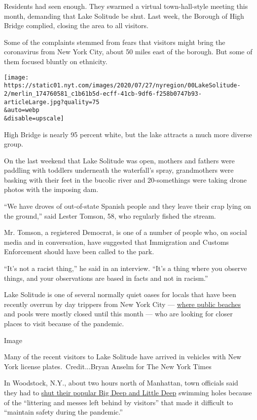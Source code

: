 Residents had seen enough. They swarmed a virtual town-hall-style
meeting this month, demanding that Lake Solitude be shut. Last week, the
Borough of High Bridge complied, closing the area to all visitors.

Some of the complaints stemmed from fears that visitors might bring the
coronavirus from New York City, about 50 miles east of the borough. But
some of them focused bluntly on ethnicity.

\texttt{[image: https://static01.nyt.com/images/2020/07/27/nyregion/00LakeSolitude-2/merlin\_174760581\_c1b61b5d-ecff-41cb-9df6-f258b0747b93-articleLarge.jpg?quality=75\\\&auto=webp\\\&disable=upscale]}

High Bridge is nearly 95 percent white, but the lake attracts a much
more diverse group.

On the last weekend that Lake Solitude was open, mothers and fathers
were paddling with toddlers underneath the waterfall's spray,
grandmothers were basking with their feet in the bucolic river and
20-somethings were taking drone photos with the imposing dam.

``We have droves of out-of-state Spanish people and they leave their
crap lying on the ground,'' said Lester Tomson, 58, who regularly fished
the stream.

Mr. Tomson, a registered Democrat, is one of a number of people who, on
social media and in conversation, have suggested that Immigration and
Customs Enforcement should have been called to the park.

``It's not a racist thing,'' he said in an interview. ``It's a thing
where you observe things, and your observations are based in facts and
not in racism.''

Lake Solitude is one of several normally quiet oases for locals that
have been recently overrun by day trippers from New York City ---
\href{https://www.nytimes.com/2020/07/03/nyregion/beaches-open-nyc.html}{where
public beaches} and pools were mostly closed until this month --- who
are looking for closer places to visit because of the pandemic.

Image

Many of the recent visitors to Lake Solitude have arrived in vehicles
with New York license plates.~Credit...Bryan Anselm for The New York
Times

In Woodstock, N.Y., about two hours north of Manhattan, town officials
said they had to
\href{https://hudsonvalleyone.com/2020/07/08/woodstock-cracks-down-use-of-closed-swimming-holes/}{shut
their popular Big Deep and Little Deep} swimming holes because of the
``littering and messes left behind by visitors'' that made it difficult
to ``maintain safety during the pandemic.''


